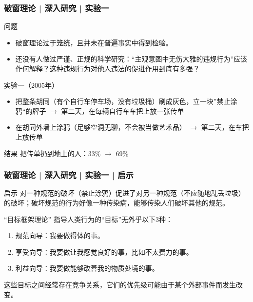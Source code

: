 \begin{frame}
  \frametitle{破窗理论 | 深入研究 | 实验一}
  \begin{block}{问题}
    \begin{itemize}
      \item 破窗理论过于笼统，且并未在普遍事实中得到检验。
      \item 还没有人做过严谨、正规的科学研究：“主观意图中无伤大雅的违规行为”应该作何解释？这种违规行为对他人违法的促进作用到底有多强？
    \end{itemize}
  \end{block}
  \pause
  \begin{block}{实验一（2005年）}
    \begin{itemize}
      \item 把整条胡同（有个自行车停车场，没有垃圾桶）刷成灰色，立一块”禁止涂鸦“的牌子 $\rightarrow$ 第二天，在每辆自行车车把上放一张传单
      \item 在胡同外墙上涂鸦（足够空洞无聊，不会被当做艺术品） $\rightarrow$ 第二天，在车把上放传单
    \end{itemize}
  \end{block}
  \pause
  \begin{block}{结果}
    把传单扔到地上的人：33\% $\rightarrow$ 69\%
  \end{block}
\end{frame}

\begin{frame}
  \frametitle{破窗理论 | 深入研究 | 实验一 | \alert{启示}}
  \begin{block}{启示}
对一种规范的破坏（禁止涂鸦）促进了对另一种规范（不应随地乱丢垃圾）的破坏；破坏规范的行为好像一种传染病，能够传染人们破坏其他的规范。
  \end{block}
  \pause
  \begin{block}{“目标框架理论”}
    指导人类行为的“目标”无外乎以下3种：
    \begin{enumerate}
      \item 规范向导：我要做得体的事。
      \item 享受向导：我要做让我感觉良好的事，比如不太费力的事。
      \item 利益向导：我要做能够改善我的物质处境的事。
    \end{enumerate}
    这些目标之间经常存在竞争关系，它们的优先级可能由于某个外部事件而发生改变。
  \end{block}
\end{frame}

